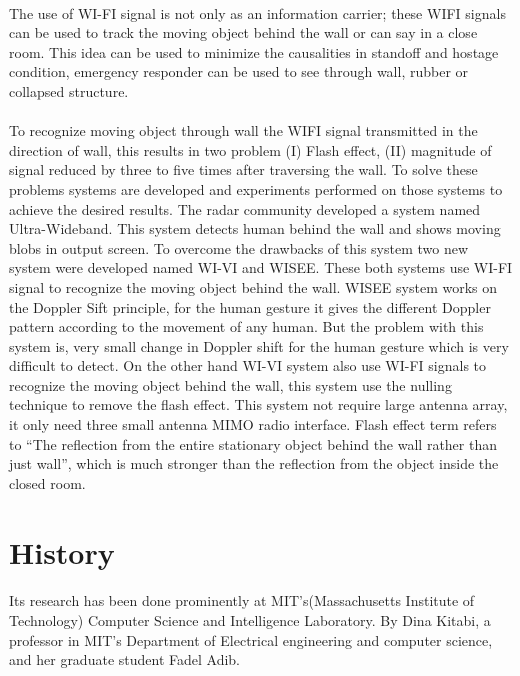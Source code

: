 \documentclass[a4paper,12pt,oneside]{article}
\begin{document}
\paragraph{}
The use of WI-FI signal is not only as an information carrier; these WIFI signals can be used to track the moving object behind the wall or can say in a close room. This idea can be used to minimize the causalities in standoff and hostage condition, emergency responder can be used to see through wall, rubber or collapsed structure.
\paragraph{}
To recognize moving object through wall the WIFI signal transmitted in the direction of
wall, this results in two problem (I) Flash effect, (II) magnitude of signal reduced by three to five
times after traversing the wall. To solve these problems systems are developed and experiments
performed on those systems to achieve the desired results. The radar community developed a
system named Ultra-Wideband. This system detects human behind the wall and shows moving
blobs in output screen. To overcome the drawbacks of this system two new system were
developed named WI-VI and WISEE. These both systems use WI-FI signal to recognize the
moving object behind the wall. WISEE system works on the Doppler Sift principle, for the
human gesture it gives the different Doppler pattern according to the movement of any human.
But the problem with this system is, very small change in Doppler shift for the human gesture
which is very difficult to detect. On the other hand WI-VI system also use WI-FI signals to
recognize the moving object behind the wall, this system use the nulling technique to remove the
flash effect. This system not require large antenna array, it only need three small antenna MIMO
radio interface. Flash effect term refers to “The reflection from the entire stationary object
behind the wall rather than just wall”, which is much stronger than the reflection from the object
inside the closed room.


\newpage
\section{History}
\paragraph{}
Its research has been done prominently at MIT’s(Massachusetts Institute of Technology)
Computer Science and Intelligence Laboratory. By Dina Kitabi, a professor in MIT’s Department
of Electrical engineering and computer science, and her graduate student Fadel Adib.
\end{document}
